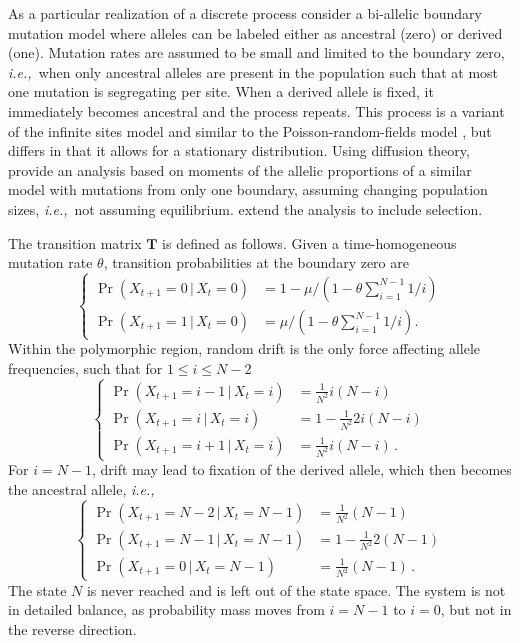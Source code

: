 \documentclass[preprint]{elsarticle}
\newcommand\given{{\,|\,}}
\newcommand\ie{{\it i.e.,}}
\newcommand\x[1]{\ensuremath{X_{#1}}}
\begin{document}
As a particular realization of a discrete process consider a bi-allelic boundary mutation model where alleles can be labeled either as ancestral (zero) or derived (one). Mutation rates are assumed to be small and limited to the boundary zero, \ie\ when only ancestral alleles are present in the population such that at most one mutation is segregating per site. When a derived allele is fixed, it immediately becomes ancestral and the process repeats. This process is a variant of the infinite sites model \citep{Kimu69} and similar to the Poisson-random-fields model \citep{Sawy92}, but differs in that it allows for a stationary distribution. Using diffusion theory, \citet{Evan07} provide an analysis based on moments of the allelic proportions of a similar model with mutations from only one boundary, assuming changing population sizes, \ie\ not assuming equilibrium. \citet{Zivk15} extend the analysis to include selection. 

The transition matrix $\mathbf{T}$ is defined as follows. Given a time-homogeneous mutation rate $\theta$, transition probabilities at the boundary zero are
\begin{equation}
\begin{cases}
\Pr(\x{t+1}=0\given \x{t}=0)&=1-\mu/(1-\theta\sum_{i=1}^{N-1}1/i)\\
\Pr(\x{t+1}=1\given \x{t}=0)&=\mu/(1-\theta\sum_{i=1}^{N-1}1/i).
\end{cases}
\end{equation}
Within the polymorphic region, random drift is the only force affecting allele frequencies, such that for $1\leq i \leq N-2$
\begin{equation}
\begin{cases}
\Pr(\x{t+1}=i-1\given \x{t}=i) &=\frac1{N^2} i(N-i)\\
\Pr(\x{t+1}=i\given \x{t}=i)   &=1-\frac1{N^2} 2i(N-i)\\
\Pr(\x{t+1}=i+1\given \x{t}=i) &=\frac1{N^2} i(N-i)\,.
\end{cases}
\end{equation}
For $i=N-1$, drift may lead to fixation of the derived allele, which then becomes the ancestral allele, \ie\
\begin{equation}
\begin{cases}
\Pr(\x{t+1}=N-2\given \x{t}=N-1) &=\frac1{N^2} (N-1)\\
\Pr(\x{t+1}=N-1\given \x{t}=N-1) &=1-\frac1{N^2} 2(N-1)\\
\Pr(\x{t+1}=0\given \x{t}=N-1)   &=\frac1{N^2} (N-1)\,.
\end{cases}
\end{equation}
The state $N$ is never reached and is left out of the state space. The system is not in detailed balance, as probability mass moves from $i=N-1$ to $i=0$, but not in the reverse direction.
\end{document}

